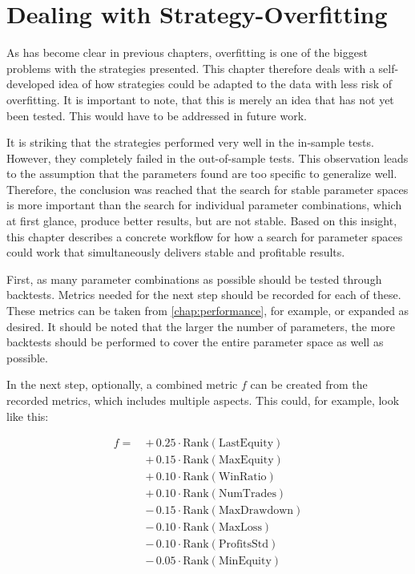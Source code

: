 \section{Dealing with Strategy-Overfitting}
\label{chap:overfitting}

As has become clear in previous chapters, overfitting is one of the biggest problems with the strategies presented.
This chapter therefore deals with a self-developed idea of how strategies could be adapted to the data with less risk of overfitting.
It is important to note, that this is merely an idea that has not yet been tested.
This would have to be addressed in future work.

It is striking that the strategies performed very well in the in-sample tests.
However, they completely failed in the out-of-sample tests.
This observation leads to the assumption that the parameters found are too specific to generalize well.
Therefore, the conclusion was reached that the search for stable parameter spaces is more important than the search for individual parameter combinations, which at first glance, produce better results, but are not stable.
Based on this insight, this chapter describes a concrete workflow for how a search for parameter spaces could work that simultaneously delivers stable and profitable results.

First, as many parameter combinations as possible should be tested through backtests.
Metrics needed for the next step should be recorded for each of these.
These metrics can be taken from \autoref{chap:performance}, for example, or expanded as desired.
It should be noted that the larger the number of parameters, the more backtests should be performed to cover the entire parameter space as well as possible.

In the next step, optionally, a combined metric $f$ can be created from the recorded metrics, which includes multiple aspects.
This could, for example, look like this:

\[
    \begin{aligned}
        f =\ &+\, 0.25 \cdot \text{Rank}(\text{LastEquity}) \\
        &+\, 0.15 \cdot \text{Rank}(\text{MaxEquity}) \\
        &+\, 0.10 \cdot \text{Rank}(\text{WinRatio}) \\
        &+\, 0.10 \cdot \text{Rank}(\text{NumTrades}) \\
        &-\, 0.15 \cdot \text{Rank}(\text{MaxDrawdown}) \\
        &-\, 0.10 \cdot \text{Rank}(\text{MaxLoss}) \\
        &-\, 0.10 \cdot \text{Rank}(\text{ProfitsStd}) \\
        &-\, 0.05 \cdot \text{Rank}(\text{MinEquity})
    \end{aligned}
\]


